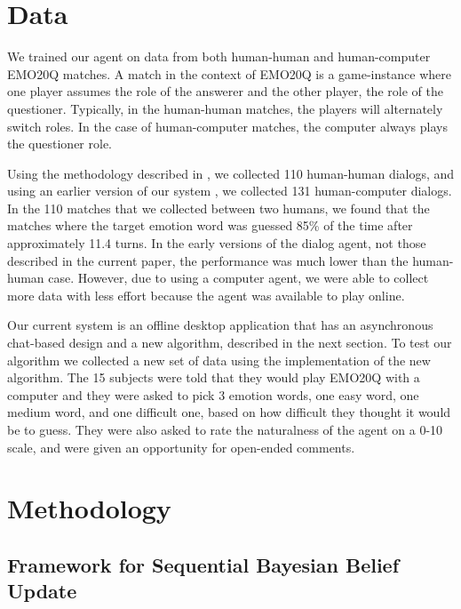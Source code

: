 \documentclass[a4paper]{article}
\begin{document}
\section{Data}
\label{sec:data}
We trained our agent on data from both human-human and human-computer EMO20Q
matches.  A match in the context of EMO20Q is a game-instance where one player
assumes the role of the answerer and the other player, the role of the
questioner.  Typically, in the human-human matches, the players will
alternately switch roles.  In the case of human-computer matches, the computer
always plays the questioner role.

Using the methodology described in \cite{Kazemzadeh2011a}, we collected 110
human-human dialogs, and using an earlier version of our system
\cite{Kazemzadeh2011d}, we collected 131 human-computer dialogs.  In the 110
matches that we collected between two humans, we found that the matches where
the target emotion word was guessed 85\% of the time after approximately 11.4
turns.  In the early versions of the dialog agent, not those described in the
current paper, the performance was much lower than the human-human case.
However, due to using a computer agent, we were able to collect more data with
less effort because the agent was available to play online.

Our current system is an offline desktop application that has an asynchronous
chat-based design and a new algorithm, described in the next section.
To test our algorithm we collected a new set of data using the implementation
of the new algorithm.  The 15 subjects were told that they would play EMO20Q
with a computer and they were asked to pick 3 emotion words, one easy word,
one medium word, and one difficult one, based on how difficult they thought it
would be to guess.  They were also asked to rate the naturalness of the agent
on a 0-10 scale, and were given an opportunity for open-ended comments.


\section{Methodology}
\label{sec:methodology}
\subsection{Framework for Sequential Bayesian Belief Update}

\end{document}
